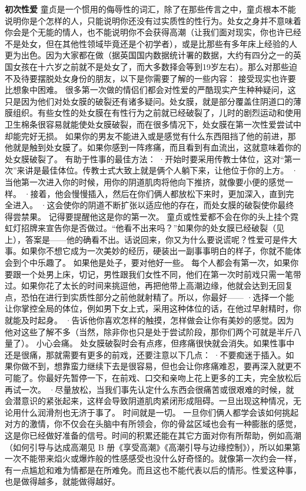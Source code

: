 \documentclass[12pt,UTF8,openany]{ctexbook}
\begin{document}
\textbf{初次性爱}
童贞是一个惯用的侮辱性的词汇，除了在那些传言之中，童贞根本不能说明你是个怎样的人，只能说明你还没有过实质性的性行为。处女之身并不意味着你会是个无能的情人，也不能说明你不会获得高潮（让我们面对现实，你也许已经不是处女，但在其他性领域毕竟还是个初学者），或是比那些有多年床上经验的人更为出色。因为大家都在做（据英国国内数据统计署的数据，大约有四分之一的英国女孩在十六岁之前就不是处女了，而大多数择会等到19岁左右）。那么对那些迫不及待要摆脱处女身份的朋友，以下是你需要了解的一些内容：
接受现实也许要比想象中困难。
很多第一次做的情侣们都会对性爱的严酷现实产生种种疑问，这只是因为他们对处女膜的破裂还有诸多疑问。处女膜，就是部分覆盖住阴道口的薄膜组织。有些女性的处女膜在有性行为之前就已经破裂了，儿时的剧烈运动和使用卫生棉条很容易就能使处女膜破裂，而在很多情况下，处女膜在第一次性爱尝试中却能完好无损。
如果你的男友不能进入或是感觉有什么东西阻挡了他的前进，那他就是触到处女膜了。如果你感到一阵疼痛，而且看到有血流出，这就意味着你的处女膜破裂了。
有助于性事的最佳方法：
·开始时要采用传教士体位，这对“第一次”来讲是最佳体位。传教士式大致上就是俩个人躺下来，让他位于你的上方。
·当他第一次进入你的时候，用你的阴道肌肉将他向下推挤，就像要小便的感觉一样。
·接着，他会慢慢插入，然后在你们俩人都放松下来时，更加深入，直到完全进入。
·这会使你的阴道不断扩张以适应他的存在，而处女膜的破裂使你最终得尝禁果。
记得要提醒他这是你的第一次。
童贞或性爱都不会在你的头上挂个霓虹灯招牌来宣告你是否做过。“他看不出来吗？”如果你的处女膜已经破裂（见上），答案是——他的确看不出。话说回来，你又为什么要说谎呢？性爱可是件大事。如果你不想它成为一次美妙的经历，硬装出一副事事明白的样子，你就不能体会到个中乐趣了。
如果他是处子，要对他好一些。
每个人都会有第一次，如果你要跟一个处男上床，切记，男性跟我们女性不同，他们在第一次时前戏只需一笔带过。如果你花了太长的时间来挑逗他，再把他带上高潮边缘，他就会达到无回复点，恐怕在进行到实质性部分之前他就射精了。所以，你最好——
·选择一个能让你掌控全局的体位，例如男下女上式，采用这种体位的话，在他过早射精时，你就能及时起身。
·告诉他你喜欢怎样的触摸，怎样做会让你有美妙的感觉。因为他对这些了解不多（当然，除非你也只是处于尝试阶段，那你们两个可就是半斤八量了）。
小心会痛。
处女膜破裂时会有点疼，但疼痛很快就会消失。如果性事中还是很痛，那就需要有更多的前戏，还要注意以下几点：
·不要痴迷于插入。如果你做不到，想靠蛮力继续下去是很容易，但也会让你疼痛难忍，要再深入就更不可能了。你最好先暂停一下，在前戏、口交和亲吻上花上更多的工夫，完全放松后再试一次。
·尽量放松，当我们事先认定什么东西会很痛苦或很艰难的时候，就会潜意识的紧张起来，这样会导致阴道肌肉紧闭形成阻碍。一旦出现这种情况，无论用什么润滑剂也无济于事了。
时间就是一切。
一旦你们俩人都学会该如何挑起对方的激情，你不仅会在头脑中有所领会，你的骨盆区域也会有一种膨胀的感觉，这是你已经做好准备的信号。时间的积累还能在其它方面对你有所帮助，例如高潮（如何引导与达成高潮见 B 册《享受高潮》《高潮引导与边缘控制》），所以如果第一次不能带来焰火或爆炸般的性感感受也没什么好奇怪的。就像第一次约会一样，有一点尴尬和难为情都是在所难免。而且这也不能代表以后的情形。性爱这种事，也是做得越多，就能做得越好。
\end{document}
